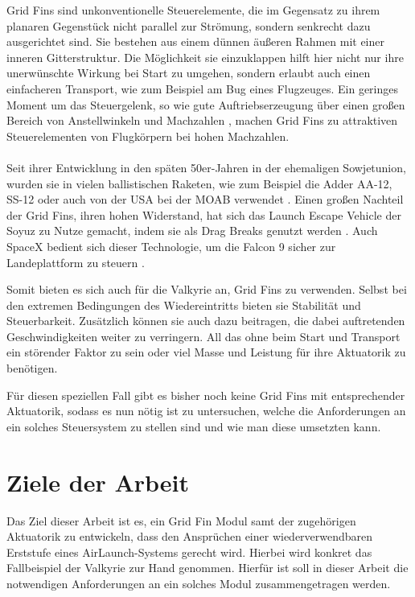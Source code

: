 Grid Fins sind unkonventionelle Steuerelemente, die im Gegensatz zu ihrem planaren Gegenstück nicht parallel zur Strömung, sondern senkrecht dazu ausgerichtet sind. Sie bestehen aus einem dünnen äußeren Rahmen mit einer inneren Gitterstruktur. Die Möglichkeit sie einzuklappen hilft hier nicht nur ihre unerwünschte Wirkung bei Start zu umgehen, sondern erlaubt auch einen einfacheren Transport, wie zum Beispiel am Bug eines Flugzeuges. Ein geringes Moment um das Steuergelenk, so wie gute Auftriebserzeugung über einen großen Bereich von Anstellwinkeln und Machzahlen \cite{vergleichPlanar}, machen Grid Fins zu attraktiven Steuerelementen von Flugkörpern bei hohen Machzahlen.
\\~\\
Seit ihrer Entwicklung in den späten 50er-Jahren in der ehemaligen Sowjetunion, wurden sie in vielen ballistischen Raketen, wie zum Beispiel die Adder AA-12, SS-12 oder auch von der USA bei der \gls{MOAB} verwendet \cite{sehnenlaenge}. Einen großen Nachteil der Grid Fins, ihren hohen Widerstand, hat sich das Launch Escape Vehicle der Soyuz zu Nutze gemacht, indem sie als Drag Breaks genutzt werden \cite{sehnenlaenge}. Auch SpaceX bedient sich dieser Technologie, um die Falcon 9 sicher zur Landeplattform zu steuern \cite{sehnenlaenge}.

Somit bieten es sich auch für die Valkyrie an, Grid Fins zu verwenden. Selbst bei den extremen Bedingungen des Wiedereintritts bieten sie Stabilität und Steuerbarkeit. Zusätzlich können sie auch dazu beitragen, die dabei auftretenden Geschwindigkeiten weiter zu verringern. All das ohne beim Start und Transport ein störender Faktor zu sein oder viel Masse und Leistung für ihre Aktuatorik zu benötigen.

Für diesen speziellen Fall gibt es bisher noch keine Grid Fins mit entsprechender Aktuatorik, sodass es nun nötig ist zu untersuchen, welche die Anforderungen an ein solches Steuersystem zu stellen sind und wie man diese umsetzten kann.

\section{Ziele der Arbeit}
Das Ziel dieser Arbeit ist es, ein Grid Fin Modul samt der zugehörigen Aktuatorik zu entwickeln, dass den Ansprüchen einer wiederverwendbaren Erststufe eines AirLaunch-Systems gerecht wird. Hierbei wird konkret das Fallbeispiel der Valkyrie zur Hand genommen.
Hierfür ist soll in dieser Arbeit die notwendigen Anforderungen an ein solches Modul zusammengetragen werden.

